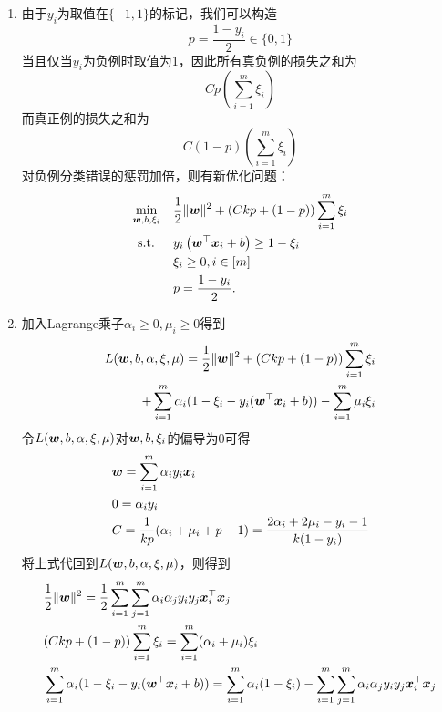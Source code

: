 \documentclass[answers]{exam}  %
\begin{document}
\begin{questions}
	\begin{solution}
	    \begin{enumerate}
        \item 由于$y_i$为取值在$\{-1,1\}$的标记，我们可以构造
        \[p=\frac{1-y_i} 2\in\{0,1\}\]
        当且仅当$y_i$为负例时取值为1，因此所有真负例的损失之和为
        \[Cp(\sum^m_{i=1}\xi_i) \]
        而真正例的损失之和为
        \[C(1-p)(\sum^m_{i=1}\xi_i) \]
        对负例分类错误的惩罚加倍，则有新优化问题：
        \[
            \begin{aligned} 
                \min _{\boldsymbol{w}, b, \xi_{i}} \quad & \frac{1}{2}\|\boldsymbol{w}\|^{2}+(Ckp+(1-p))\sum_{i=1}^m\xi_i \\
                         \text { s.t. } \quad & y_{i}\left(\boldsymbol{w}^\top {\boldsymbol{x}}_{i}+b\right) \geq 1-\xi_{i} \\
                                              & \xi_{i} \geq 0, i\in [m]\\
                                              & p = \frac{1-y_i}2.
            \end{aligned}
        \]
        \item 加入Lagrange乘子$\alpha_i\ge0,\mu_i\ge0$得到
        \[
            \begin{aligned}
                L(\boldsymbol{w},b,\alpha,\xi,\mu)=\frac12\|\boldsymbol{w}\|^2+ (Ckp+(1-p))\sum_{i=1}^m\xi_i\\
                +\sum^m_{i=1}\alpha_i(1-\xi_i-y_i(\boldsymbol{w}^\top {\boldsymbol{x}}_i+b))-\sum^m_{i=1}\mu_i\xi_i
            \end{aligned}
        \]
        令$L(\boldsymbol{w},b,\alpha,\xi,\mu)$对$\boldsymbol{w},b,\xi_i$的偏导为0可得
        \[
            \begin{aligned}
                &\boldsymbol{w}=\sum^m_{i=1}\alpha_iy_i{\boldsymbol{x}}_i\\
                &0=\alpha_iy_i\\
                &C=\frac1{kp}(\alpha_i+\mu_i+p-1)= \frac{2\alpha_i+2\mu_i-y_i-1}{k(1-y_i)}
            \end{aligned}    
        \]
        将上式代回到$L(\boldsymbol{w},b,\alpha,\xi,\mu)$，则得到
        \[ 
            \begin{aligned}
                &\frac12\|\vw\|^2=\frac12\sum^m_{i=1}\sum^m_{j=1}\alpha_i\alpha_j y_i y_j\vx_i^\top\vx_j\\
                &(Ckp+(1-p))\sum_{i=1}^m\xi_i= \sum^m_{i=1}(\alpha_i+\mu_i)\xi_i\\
                &\sum^m_{i=1}\alpha_i(1-\xi_i-y_i(\vw^\top \vx_i+b))=\sum^m_{i=1}\alpha_i(1-\xi_i)-\sum^m_{i=1}\sum^m_{j=1}\alpha_i\alpha_j y_i y_j\vx_i^\top\vx_j

\end{aligned}\]
\end{enumerate}
\end{solution}
\end{questions}
\end{document}
